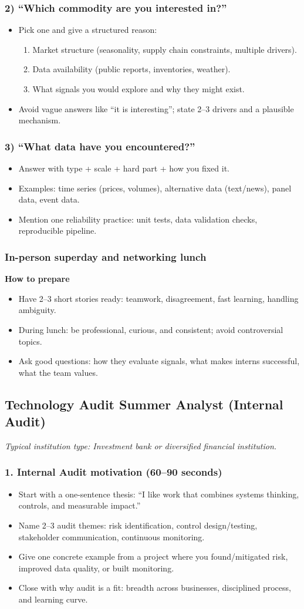 \documentclass[11pt,letterpaper,openany]{book}
\newcommand{\RoleProfile}[2]{%
  \subsection{#1}%
  \noindent\textit{Typical institution type: #2.}\par
}
\newcommand{\prompt}[1]{\subsubsection*{#1}}
\begin{document}
\prompt{2) ``Which commodity are you interested in?''}
\begin{itemize}
  \item Pick one and give a structured reason:
  \begin{enumerate}
    \item Market structure (seasonality, supply chain constraints, multiple drivers).
    \item Data availability (public reports, inventories, weather).
    \item What signals you would explore and why they might exist.
  \end{enumerate}
  \item Avoid vague answers like ``it is interesting''; state 2--3 drivers and a plausible mechanism.
\end{itemize}

\prompt{3) ``What data have you encountered?''}
\begin{itemize}
  \item Answer with type + scale + hard part + how you fixed it.
  \item Examples: time series (prices, volumes), alternative data (text/news), panel data, event data.
  \item Mention one reliability practice: unit tests, data validation checks, reproducible pipeline.
\end{itemize}

\prompt{In-person superday and networking lunch}
\textbf{How to prepare}
\begin{itemize}
  \item Have 2--3 short stories ready: teamwork, disagreement, fast learning, handling ambiguity.
  \item During lunch: be professional, curious, and consistent; avoid controversial topics.
  \item Ask good questions: how they evaluate signals, what makes interns successful, what the team values.
\end{itemize}

\RoleProfile{Technology Audit Summer Analyst (Internal Audit)}{Investment bank or diversified financial institution}

\prompt{1. Internal Audit motivation (60--90 seconds)}
\begin{itemize}
  \item Start with a one-sentence thesis: ``I like work that combines systems thinking, controls, and measurable impact.''
  \item Name 2--3 audit themes: risk identification, control design/testing, stakeholder communication, continuous monitoring.
  \item Give one concrete example from a project where you found/mitigated risk, improved data quality, or built monitoring.
  \item Close with why audit is a fit: breadth across businesses, disciplined process, and learning curve.
\end{itemize}
\end{document}
